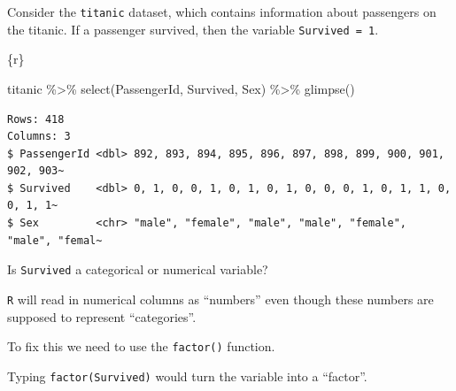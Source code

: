 \documentclass[
  letterpaper,
  DIV=11,
  numbers=noendperiod]{scrreprt}
\newenvironment{Shaded}{\begin{snugshade}}{\end{snugshade}}
\newcommand{\FunctionTok}[1]{\textcolor[rgb]{0.28,0.35,0.67}{#1}}
\newcommand{\InformationTok}[1]{\textcolor[rgb]{0.37,0.37,0.37}{#1}}
\newcommand{\NormalTok}[1]{\textcolor[rgb]{0.00,0.23,0.31}{#1}}
\newcommand{\SpecialCharTok}[1]{\textcolor[rgb]{0.37,0.37,0.37}{#1}}
\begin{document}
\begin{tcolorbox}[enhanced jigsaw, breakable, colback=white, bottomrule=.15mm, leftrule=.75mm, colframe=quarto-callout-note-color-frame, arc=.35mm, rightrule=.15mm, toprule=.15mm, left=2mm, opacityback=0]
Consider the \texttt{titanic} dataset, which contains information about
passengers on the titanic. If a passenger survived, then the variable
\texttt{Survived\ =\ 1}.

\begin{Shaded}
\begin{Highlighting}[]
\InformationTok{\textasciigrave{}\textasciigrave{}\textasciigrave{}\{r\}}

\NormalTok{titanic }\SpecialCharTok{\%\textgreater{}\%} 
  \FunctionTok{select}\NormalTok{(PassengerId, Survived, Sex) }\SpecialCharTok{\%\textgreater{}\%}
  \FunctionTok{glimpse}\NormalTok{()}
\InformationTok{\textasciigrave{}\textasciigrave{}\textasciigrave{}}
\end{Highlighting}
\end{Shaded}

\begin{verbatim}
Rows: 418
Columns: 3
$ PassengerId <dbl> 892, 893, 894, 895, 896, 897, 898, 899, 900, 901, 902, 903~
$ Survived    <dbl> 0, 1, 0, 0, 1, 0, 1, 0, 1, 0, 0, 0, 1, 0, 1, 1, 0, 0, 1, 1~
$ Sex         <chr> "male", "female", "male", "male", "female", "male", "femal~
\end{verbatim}

Is \texttt{Survived} a categorical or numerical variable?

\texttt{R} will read in numerical columns as ``numbers'' even though
these numbers are supposed to represent ``categories''.

To fix this we need to use the \texttt{factor()} function.

Typing \texttt{factor(Survived)} would turn the variable into a
``factor''.
\end{tcolorbox}
\end{document}
